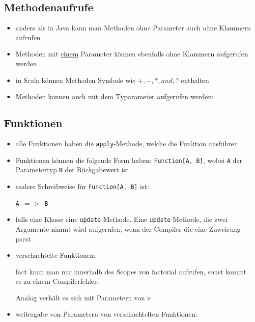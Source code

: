 \subsection{Methodenaufrufe}
\begin{itemize}
  \item anders als in Java kann man Methoden ohne Parameter auch ohne Klammern aufrufen
  \item Methoden mit \uline{einem} Parameter können ebenfalls ohne Klammern aufgerufen werden
  
  
  
  \item in Scala können Methoden Symbole wie
  $+, -, *, and, ?$ enthalten
  \item Methoden können auch mit dem Typarameter aufgerufen werden:
  
  
  
\end{itemize}


\subsection{Funktionen}
\begin{itemize}
  \item alle Funktionen haben die \texttt{apply}-Methode, welche die Funktion ausführen
  \item Funktionen können die folgende Form
  haben: \texttt{Function[A, B]}, wobei \texttt{A} der Parametertyp 
  \und \texttt{B} der Rückgabewert ist
  
  
  \item andere Schreibweise für \texttt{Function[A, B]} ist:
  
  \texttt{A $=>$ B}
  
  \item falls eine Klasse eine \texttt{update} Methode. Eine \texttt{update}
  Methode, die zwei  Argumente nimmt wird aufgerufen, wenn der Compiler die
  eine Zuweisung parst
  
  
  \item verschachtelte Funktionen:
  
  
  
  fact kann man nur innerhalb des Scopes von factorial aufrufen, sonst kommt
  es zu einem Compilerfehler.
  
  Analog verhält es sich mit Parametern von v
  \item weitergabe von Parametern von verschachtelten Funktionen:
  
    
\end{itemize}


